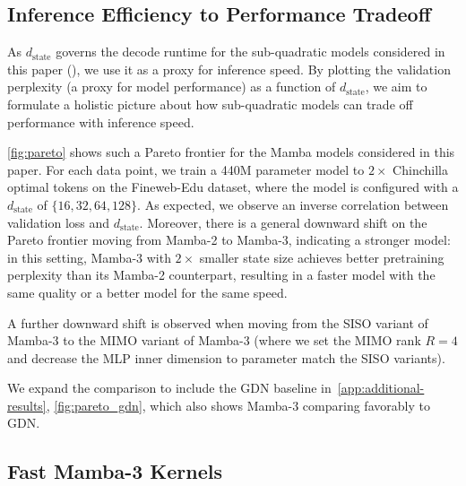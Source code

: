 \subsection{Inference Efficiency to Performance Tradeoff}
\label{sec:exp:pareto}

\latencytable

As $d_\text{state}$ governs the decode runtime for the sub-quadratic models considered in this paper (), we use it as a proxy for inference speed.
By plotting the validation perplexity (a proxy for model performance) as a function of $d_\text{state}$, we aim to formulate a holistic picture about how sub-quadratic models can trade off performance with inference speed. 

\cref{fig:pareto} shows such a Pareto frontier for the Mamba models considered in this paper.
For each data point, we train a 440M parameter model to $2\times$ Chinchilla optimal tokens on the Fineweb-Edu dataset, where the model is configured with a $d_\text{state}$ of $\{16, 32, 64, 128\}$.
As expected, we observe an inverse correlation between validation loss and $d_\text{state}$.
Moreover, there is a general downward shift on the Pareto frontier moving from Mamba-2 to Mamba-3, indicating a stronger model:
in this setting, Mamba-3 with $2\times$ smaller state size achieves better pretraining perplexity than its Mamba-2 counterpart, resulting in a faster model with the same quality or a better model for the same speed.

A further downward shift is observed when moving from the SISO variant of Mamba-3 to the MIMO variant of Mamba-3 (where we set the MIMO rank $R = 4$ and decrease the MLP inner dimension to parameter match the SISO variants).

We expand the comparison to include the GDN baseline in~\cref{app:additional-results}, \cref{fig:pareto_gdn}, which also shows Mamba-3 comparing favorably to GDN. %

\subsection{Fast Mamba-3 Kernels}
\label{sec:exp:speed}

